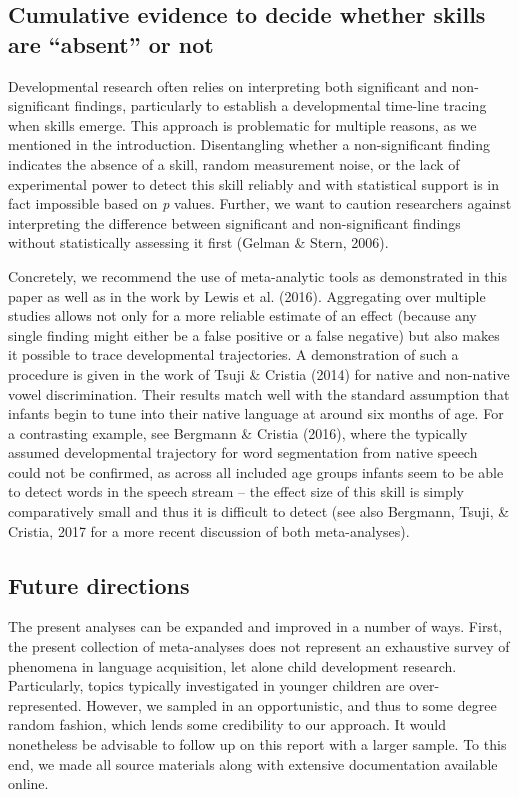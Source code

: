 \documentclass[english,floatsintext,man]{apa6}
\begin{document}
\subsection{\texorpdfstring{Cumulative evidence to decide whether skills
are \enquote{absent} or
not}{Cumulative evidence to decide whether skills are absent or not}}\label{cumulative-evidence-to-decide-whether-skills-are-absent-or-not}

Developmental research often relies on interpreting both significant and
non-significant findings, particularly to establish a developmental
time-line tracing when skills emerge. This approach is problematic for
multiple reasons, as we mentioned in the introduction. Disentangling
whether a non-significant finding indicates the absence of a skill,
random measurement noise, or the lack of experimental power to detect
this skill reliably and with statistical support is in fact impossible
based on \emph{p} values. Further, we want to caution researchers
against interpreting the difference between significant and
non-significant findings without statistically assessing it first
(Gelman \& Stern, 2006).

Concretely, we recommend the use of meta-analytic tools as demonstrated
in this paper as well as in the work by Lewis et al. (2016). Aggregating
over multiple studies allows not only for a more reliable estimate of an
effect (because any single finding might either be a false positive or a
false negative) but also makes it possible to trace developmental
trajectories. A demonstration of such a procedure is given in the work
of Tsuji \& Cristia (2014) for native and non-native vowel
discrimination. Their results match well with the standard assumption
that infants begin to tune into their native language at around six
months of age. For a contrasting example, see Bergmann \& Cristia
(2016), where the typically assumed developmental trajectory for word
segmentation from native speech could not be confirmed, as across all
included age groups infants seem to be able to detect words in the
speech stream -- the effect size of this skill is simply comparatively
small and thus it is difficult to detect (see also Bergmann, Tsuji, \&
Cristia, 2017 for a more recent discussion of both meta-analyses).

\subsection{Future directions}\label{future-directions}

The present analyses can be expanded and improved in a number of ways.
First, the present collection of meta-analyses does not represent an
exhaustive survey of phenomena in language acquisition, let alone child
development research. Particularly, topics typically investigated in
younger children are over-represented. However, we sampled in an
opportunistic, and thus to some degree random fashion, which lends some
credibility to our approach. It would nonetheless be advisable to follow
up on this report with a larger sample. To this end, we made all source
materials along with extensive documentation available online.
\end{document}
